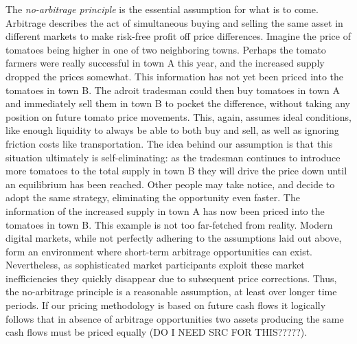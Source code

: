\documentclass[english,12pt,a4paper,pdftex,sci,utf8]{aaltothesis}
\begin{document}
The \emph{no-arbitrage principle} is the essential assumption for what is to come. Arbitrage describes the act of simultaneous buying and selling the same asset in different markets to make risk-free profit off price differences. Imagine the price of tomatoes being higher in one of two neighboring towns. Perhaps the tomato farmers were really successful in town A this year, and the increased supply dropped the prices somewhat. This information has not yet been priced into the tomatoes in town B. The adroit tradesman could then buy tomatoes in town A and immediately sell them in town B to pocket the difference, without taking any position on future tomato price movements. This, again, assumes ideal conditions, like enough liquidity to always be able to both buy and sell, as well as ignoring friction costs like transportation. The idea behind our assumption is that this situation ultimately is self-eliminating: as the tradesman continues to introduce more tomatoes to the total supply in town B they will drive the price down until an equilibrium has been reached. Other people may take notice, and decide to adopt the same strategy, eliminating the opportunity even faster. The information of the increased supply in town A has now been priced into the tomatoes in town B. This example is not too far-fetched from reality. Modern digital markets, while not perfectly adhering to the assumptions laid out above, form an environment where short-term arbitrage opportunities can exist. Nevertheless, as sophisticated market participants exploit these market inefficiencies they quickly disappear due to subsequent price corrections. Thus, the no-arbitrage principle is a reasonable assumption, at least over longer time periods. If our pricing methodology is based on future cash flows it logically follows that in absence of arbitrage opportunities two assets producing the same cash flows must be priced equally (DO I NEED SRC FOR THIS?????).
\end{document}
